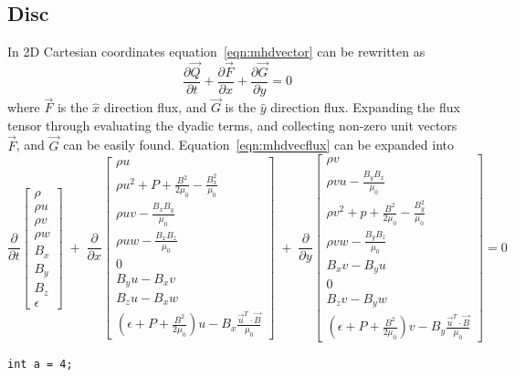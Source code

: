 \documentclass[paper=a4, fontsize=11pt]{scrartcl}
\newcommand{\pfrac}[2]{\frac{\partial#1}{\partial#2}}
\numberwithin{equation}{section}                %
\numberwithin{figure}{section}                  %
\numberwithin{table}{section}                           %
\begin{document}
\subsection{Disc}
In 2D Cartesian coordinates equation~\ref{eqn:mhdvector} can be rewritten as 
\begin{equation} \label{eqn:mhdvecflux}
  \pfrac{\vec{Q}}{t} + \pfrac{\vec{F}}{x} + \pfrac{\vec{G}}{y} = 0
\end{equation}
where $\vec{F}$ is the $\hat{x}$ direction flux, and $\vec{G}$ is the $\hat{y}$ direction flux. Expanding the flux tensor through evaluating the dyadic terms, and collecting non-zero unit vectors $\vec{F}$, and $\vec{G}$ can be easily found. Equation~\ref{eqn:mhdvecflux} can be expanded into  
\[
  \pfrac{}{t}
  \begin{bmatrix}
    \rho  \\
    \rho u  \\
    \rho v \\
    \rho w \\
    B_x \\
    B_y \\
    B_z \\
    \epsilon
  \end{bmatrix}
  \;+\;\pfrac{}{x}
  \begin{bmatrix}
    \rho u  \\
    \rho u^2 + P + \frac{B^2}{2 \mu_0} - \frac{B_x^2}{\mu_0} \\
    \rho u v - \frac{B_x B_y}{\mu_0} \\
    \rho u w - \frac{B_x B_z}{\mu_0} \\
    0 \\
    B_y u - B_x v \\
    B_z u - B_x w \\
    \left(\epsilon+ P + \frac{B^2}{2 \mu_0} \right) u - B_x\frac{\vec{u}^T\cdot\vec{B}}{\mu_0}
  \end{bmatrix}
  \;+\;\pfrac{}{y}
  \begin{bmatrix}
    \rho v  \\
    \rho v u - \frac{B_y B_x}{\mu_0} \\
    \rho v^2 + p + \frac{B^2}{2 \mu_0} - \frac{B_y^2}{\mu_0} \\
    \rho v w - \frac{B_y B_z}{\mu_0} \\
    B_x v - B_y u \\
    0 \\
    B_z v - B_y w \\
    \left(\epsilon+ P + \frac{B^2}{2 \mu_0} \right) v - B_y\frac{\vec{u}^T\cdot\vec{B}}{\mu_0}
  \end{bmatrix}
  =0
\]

\begin{lstlisting}
int a = 4;
\end{lstlisting}


 
  
\end{document}
